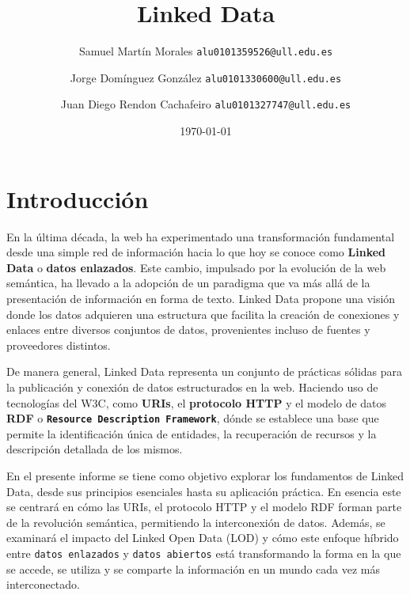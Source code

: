 \documentclass[11pt]{report}
\begin{document}

\title{Linked Data}
\author{Samuel Martín Morales  \texttt{alu0101359526@ull.edu.es} \and Jorge Domínguez González  \texttt{alu0101330600@ull.edu.es} \and Juan Diego Rendon Cachafeiro \texttt{alu0101327747@ull.edu.es}}
\date{\today}

\maketitle

\tableofcontents

\chapter{Introducción}

En la última década, la web ha experimentado una transformación fundamental desde una simple red de información hacia lo que hoy se conoce como \textbf{Linked Data} o \textbf{datos enlazados}. Este cambio, impulsado por la evolución de la web semántica, ha llevado a la adopción de un paradigma que va más allá de la  presentación de información en forma de texto. Linked Data propone una visión donde los datos adquieren una estructura que facilita la creación de conexiones y enlaces entre diversos conjuntos de datos, provenientes incluso de fuentes y proveedores distintos.

De manera general, Linked Data representa un conjunto de prácticas sólidas para la publicación y conexión de datos estructurados en la web. Haciendo uso de tecnologías del W3C, como \textbf{URIs}, el \textbf{protocolo HTTP} y el modelo de datos \textbf{RDF} o \texttt{\textbf{Resource Description Framework}}, dónde se establece una base que permite la identificación única de entidades, la recuperación de recursos y la descripción detallada de los mismos.

En el presente informe se tiene como objetivo explorar los fundamentos de Linked Data, desde sus principios esenciales hasta su aplicación práctica. En esencia este se centrará en cómo las URIs, el protocolo HTTP y el modelo RDF forman parte de la revolución semántica, permitiendo la interconexión de datos. Además, se examinará el impacto del Linked Open Data (LOD) y cómo este enfoque híbrido entre \texttt{datos enlazados} y \texttt{datos abiertos} está transformando la forma en la que se accede, se utiliza y se comparte la información en un mundo cada vez más interconectado.
\end{document}
